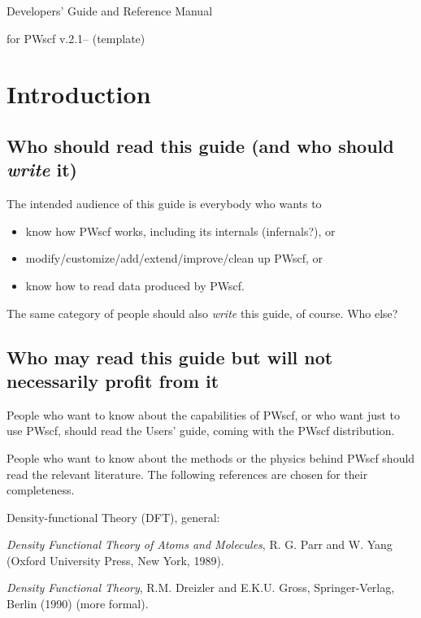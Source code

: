 \documentclass[12pt]{article}
\def\version{2.1}
\begin{document}
 
%
%
%
\par\medskip
\centerline {\Huge Developers' Guide and Reference Manual}
\centerline {\Huge for PWscf v.\version -- (template)}
\tableofcontents
\newpage

\section{Introduction}

\subsection{Who should read this guide (and who should {\em write} it)}
The intended audience of this guide is everybody who wants to
\begin{itemize}
\item know how PWscf works, including its internals (infernals?), or
\item modify/customize/add/extend/improve/clean up PWscf, or
\item know how to read data produced by PWscf.
\end{itemize}
The same category of people should also {\em write} this guide, of course.
Who else?

\subsection{Who may read this guide but will not necessarily
profit from it}

People who want to know about the capabilities of PWscf,
or who want just to use PWscf, should read the Users' guide, 
coming with the PWscf distribution.

People who want to know about the methods or the physics
behind PWscf should read the relevant literature. The
following references are chosen for their completeness.

\par\medskip\noindent
Density-functional Theory (DFT), general:
\par
{\em Density Functional Theory of Atoms and Molecules}, 
R. G. Parr and W. Yang (Oxford University Press, New York, 1989).
\par
{\em Density Functional Theory}, R.M. Dreizler and E.K.U. Gross,
Springer-Verlag, Berlin (1990) (more formal).
\end{document}
